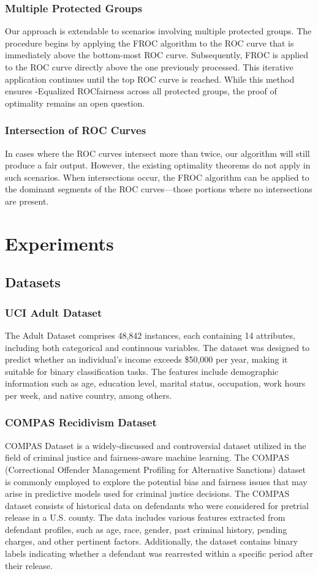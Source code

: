 \documentclass{article}
\newcommand{\ourdef}{-Equalized ROC}
\begin{document}
\subsubsection{Multiple Protected Groups}
Our approach is extendable to scenarios involving multiple protected groups. The procedure begins by applying the FROC algorithm to the ROC curve that is immediately above the bottom-most ROC curve. Subsequently, FROC is applied to the ROC curve directly above the one previously processed. This iterative application continues until the top ROC curve is reached. While this method ensures \ourdef fairness across all protected groups, the proof of optimality remains an open question.

\subsubsection{Intersection of ROC Curves}
In cases where the ROC curves intersect more than twice, our algorithm will still produce a fair output. However, the existing optimality theorems do not apply in such scenarios. When intersections occur, the FROC algorithm can be applied to the dominant segments of the ROC curves—those portions where no intersections are present.

\section{Experiments}
\subsection{Datasets}
\subsubsection{UCI Adult Dataset}
The Adult Dataset \cite{misc_adult_2} comprises 48,842 instances, each containing 14 attributes, including both categorical and continuous variables. The dataset was designed to predict whether an individual's income exceeds \$50,000 per year, making it suitable for binary classification tasks. The features include demographic information such as age, education level, marital status, occupation, work hours per week, and native country, among others.
\subsubsection{COMPAS Recidivism Dataset}
COMPAS Dataset \cite{angwin2016machine} is a widely-discussed and controversial dataset utilized in the field of criminal justice and fairness-aware machine learning. The COMPAS (Correctional Offender Management Profiling for Alternative Sanctions) dataset is commonly employed to explore the potential bias and fairness issues that may arise in predictive models used for criminal justice decisions.
The COMPAS dataset consists of historical data on defendants who were considered for pretrial release in a U.S. county. The data includes various features extracted from defendant profiles, such as age, race, gender, past criminal history, pending charges, and other pertinent factors. Additionally, the dataset contains binary labels indicating whether a defendant was rearrested within a specific period after their release.
\end{document}
